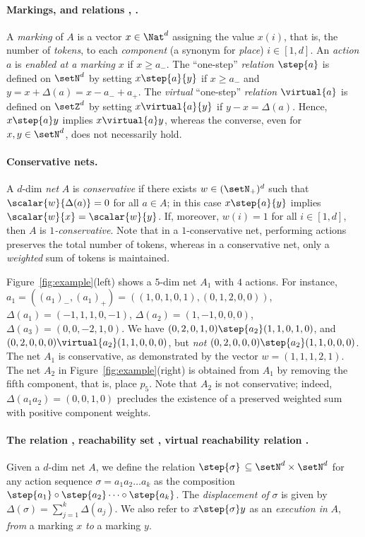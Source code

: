 \paragraph{Markings, and relations  ,
.}
A \emph{marking} of $A$ is a vector $x\in\Nat^d$ assigning the value $x(i)$, that is, the number of \emph{tokens}, to each \emph{component} (a synonym for \emph{place}) $i\in[1,d]$.
An \emph{action} $a$ is
\emph{enabled at a marking} $x$ if $x\geq a_-$.
The ``one-step'' \emph{relation} $\step{a}$
 is defined on $\setN^d$  by setting ${x}\step{a}{y}$
if  $x\geq a_-$ and $y=x+\Delta(a)=x-a_-+a_+$.
The \emph{virtual} ``one-step'' \emph{relation} $\virtual{a}$
 is defined on $\setZ^d$  by setting ${x}\virtual{a}{y}$
if  $y-x=\Delta(a)$.
Hence, $x \step{a} y$ implies $x \virtual{a} y$, whereas the converse, even for $x,y \in \setN^d$, does not necessarily hold.

\paragraph{Conservative nets.}
A $d$-dim \emph{net} $A$ is \emph{conservative} if there exists
$w\in(\setN_+)^d$ such that $\scalar{w}{\Delta(a)}=0$ for all $a\in A$;
in this case  ${x}\step{a}{y}$ implies $\scalar{w}{x}=\scalar{w}{y}$.
If, moreover, $w(i)=1$ for all $i\in[1,d]$, then $A$ is \emph{$1$-conservative}.
Note that in a $1$-conservative net, performing actions preserves the
total number of tokens, whereas in a conservative net, only a \emph{weighted} sum of tokens is maintained.

\begin{exa}\label{exa:basicnet}
Figure~\ref{fig:example}(left) shows
a $5$-dim net $A_1$ with $4$ actions. 
For instance,
$a_1=
\left((a_1)_-,(a_1)_+\right)=
\left((1,0,1,0,1),(0,1,2,0,0)\right)$,
$\Delta(a_1)=({-}1,1,1,0,{-}1)$,
	$\Delta(a_2)=(1,{-}1,0,0,0)$,
$\Delta(a_3)=(0,0,{-}2,1,0)$.
We have 
$(0,2,0,1,0)\step{a_2}(1,1,0,1,0)$, and
	$(0,2,0,0,0)\virtual{a_2}(1,1,0,0,0)$,
	but \emph{not}
$(0,2,0,0,0)\step{a_2}(1,1,0,0,0)$.
The net $A_1$ is conservative, as demonstrated by the vector 
$w=(1,1,1,2,1)$.
The net $A_2$ in Figure~\ref{fig:example}(right)
	is obtained from $A_1$ by removing the fifth component, that
	is, 
	place $p_5$. Note that $A_2$ is 
	not
	conservative; indeed, $\Delta(a_1a_2)=(0,0,1,0)$ precludes the
	existence of a preserved 
 weighted sum with positive component weights.
\end{exa}

\paragraph{The relation \bm{$\step{\sigma}$}, 
reachability set , virtual reachability relation
\bm{$\xdashrightarrow{\sigma}$}.}
Given a $d$-dim net $A$,
we define the relation
$\step{\sigma}\, \subseteq \setN^d\times\setN^d$
for any action sequence $\sigma=a_1a_2\ldots a_k$
as the
composition $\step{a_1}\circ\step{a_2}\cdots\circ\step{a_k}$.
The \emph{displacement of} $\sigma$ is given by 
$\Delta(\sigma)=\sum_{j=1}^k \Delta(a_j).$
We also refer to $x\step{\sigma}y$ as an
\emph{execution in} $A$, \emph{from} a marking $x$ \emph{to} a marking $y$.

